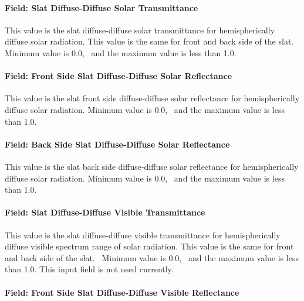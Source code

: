 \paragraph{Field: Slat Diffuse-Diffuse Solar Transmittance}\label{field-slat-diffuse-diffuse-solar-transmittance}

This value is the slat diffuse-diffuse solar transmittance for hemispherically diffuse solar radiation. This value is the same for front and back side of the slat.~ Minimum value is 0.0,~ and the maximum value is less than 1.0.

\paragraph{Field: Front Side Slat Diffuse-Diffuse Solar Reflectance}\label{field-front-side-slat-diffuse-diffuse-solar-reflectance}

This value is the slat front side diffuse-diffuse solar reflectance for hemispherically diffuse solar radiation. Minimum value is 0.0,~ and the maximum value is less than 1.0.

\paragraph{Field: Back Side Slat Diffuse-Diffuse Solar Reflectance}\label{field-back-side-slat-diffuse-diffuse-solar-reflectance}

This value is the slat back side diffuse-diffuse solar reflectance for hemispherically diffuse solar radiation. Minimum value is 0.0,~ and the maximum value is less than 1.0.

\paragraph{Field: Slat Diffuse-Diffuse Visible Transmittance}\label{field-slat-diffuse-diffuse-visible-transmittance}

This value is the slat diffuse-diffuse visible transmittance for hemispherically diffuse visible spectrum range of solar radiation. This value is the same for front and back side of the slat.~ Minimum value is 0.0,~ and the maximum value is less than 1.0. This input field is not used currently.

\paragraph{Field: Front Side Slat Diffuse-Diffuse Visible Reflectance}\label{field-front-side-slat-diffuse-diffuse-visible-reflectance}

